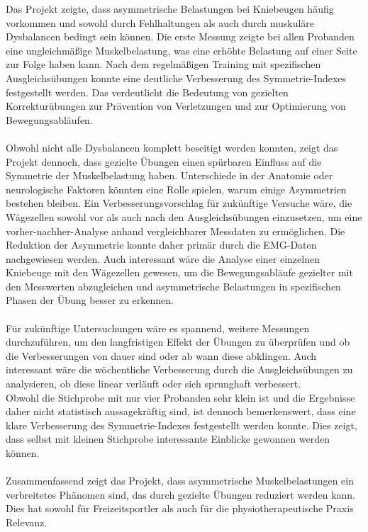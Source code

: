 Das Projekt zeigte, dass asymmetrische Belastungen bei Kniebeugen häufig vorkommen und sowohl durch Fehlhaltungen als auch durch muskuläre Dysbalancen bedingt sein können.
Die erste Messung zeigte bei allen Probanden eine ungleichmäßige Muskelbelastung, was eine erhöhte Belastung auf einer Seite zur Folge haben kann.
Nach dem regelmäßigen Training mit spezifischen Ausgleichsübungen konnte eine deutliche Verbesserung des Symmetrie-Indexes festgestellt werden.
Das verdeutlicht die Bedeutung von gezielten Korrekturübungen zur Prävention von Verletzungen und zur Optimierung von Bewegungsabläufen.
\\
\\
Obwohl nicht alle Dysbalancen komplett beseitigt werden konnten, zeigt das Projekt dennoch, dass gezielte Übungen einen spürbaren Einfluss auf die Symmetrie der Muskelbelastung haben.
Unterschiede in der Anatomie oder neurologische Faktoren könnten eine Rolle spielen, warum einige Asymmetrien bestehen bleiben.
Ein Verbesserungsvorschlag für zukünftige Versuche wäre, die Wägezellen sowohl vor als auch nach den Ausgleichsübungen einzusetzen, um eine vorher-nachher-Analyse anhand vergleichbarer Messdaten zu ermöglichen.
Die Reduktion der Asymmetrie konnte daher primär durch die EMG-Daten nachgewiesen werden.
Auch interessant wäre die Analyse einer einzelnen Kniebeuge mit den Wägezellen gewesen,  um die Bewegungsabläufe gezielter mit den Messwerten abzugleichen und asymmetrische Belastungen in spezifischen Phasen der Übung besser zu erkennen.
\\
\\
Für zukünftige Untersuchungen wäre es spannend, weitere Messungen durchzuführen, um den langfristigen Effekt der Übungen zu überprüfen und ob die Verbesserungen von dauer sind oder ab wann diese abklingen.
Auch interessant wäre die wöchentliche Verbesserung durch die Ausgleichsübungen zu analysieren, ob diese linear verläuft oder sich sprunghaft verbessert.
\\
Obwohl die Stichprobe mit nur vier Probanden sehr klein ist und die Ergebnisse daher nicht statistisch aussagekräftig sind, ist dennoch bemerkenswert, dass eine klare Verbesserung des Symmetrie-Indexes festgestellt werden konnte.
Dies zeigt, dass selbst mit kleinen Stichprobe interessante Einblicke gewonnen werden können.
\\
\\
Zusammenfassend zeigt das Projekt, dass asymmetrische Muskelbelastungen ein verbreitetes Phänomen sind, das durch gezielte Übungen reduziert werden kann. Dies hat sowohl für Freizeitsportler als auch für die physiotherapeutische Praxis Relevanz.